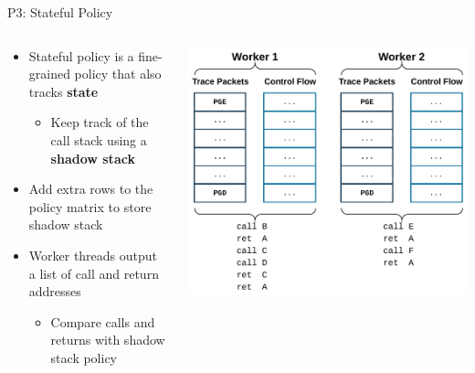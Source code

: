 \documentclass[12pt, dvipsnames, aspectratio=169]{beamer}
\begin{document}
\begin{frame}[c]{P3: Stateful Policy}{}
  \begin{columns}
    \begin{column}{0.5\textwidth}
      \begin{itemize}
        \item Stateful policy is a fine-grained policy that also tracks {\bf state}
        \begin{itemize}
          \item Keep track of the call stack using a {\bf shadow stack}
        \end{itemize}

        \vspace{1.5em}
        \item Add extra rows to the policy matrix to store shadow stack

        \vspace{1.5em}
        \item Worker threads output a list of call and return addresses
        \begin{itemize}
          \item Compare calls and returns with shadow stack policy
        \end{itemize}
      \end{itemize}
    \end{column}
    \begin{column}{0.5\textwidth}
      \color{black}
      \includegraphics[width=1\columnwidth]{figs/stateful_policy.pdf}
    \end{column}
  \end{columns}
\end{frame}
\end{document}
